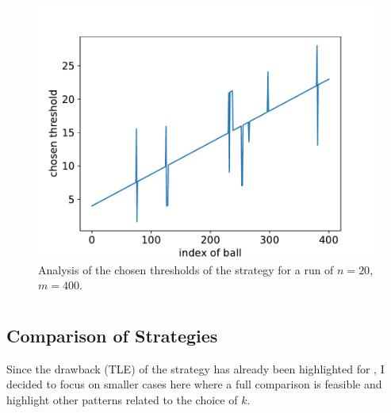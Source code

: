 \begin{figure}[h]
    \centering
    \includegraphics[scale=0.6]{Chapter4/Figs/dqn_learnt_thresholds_20_400.pdf}
    \caption{Analysis of the chosen thresholds of the \DQN strategy for a run of $n=20$, $m=400$.}
    \label{two-thinning-dqn-thresholds}
\end{figure}



\section{\KThinning}



\subsection{Comparison of Strategies} \label{k-thinning-comparison}


Since the drawback (TLE) of the \DP strategy has already been highlighted for \TwoThinning, I decided to focus on smaller cases here where a full comparison is feasible and highlight other patterns related to the choice of $k$.


